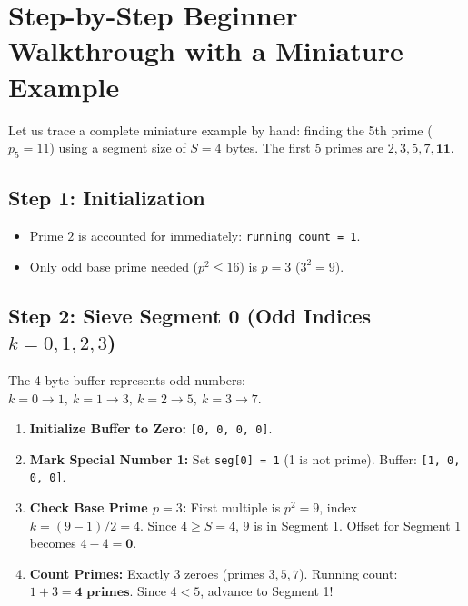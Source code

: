 \documentclass[11pt,a4paper]{article}
\begin{document}
\newpage

\section{Step-by-Step Beginner Walkthrough with a Miniature Example}

Let us trace a complete miniature example by hand: finding the 5th prime ($p_5 = 11$) using a segment size of $S = 4$ bytes. The first 5 primes are $2, 3, 5, 7, \mathbf{11}$.

\subsection{Step 1: Initialization}
\begin{itemize}\setlength{\itemsep}{0pt}
    \item Prime $2$ is accounted for immediately: \texttt{running\_count = 1}.
    \item Only odd base prime needed ($p^2 \le 16$) is $p = 3$ ($3^2 = 9$).
\end{itemize}

\subsection{Step 2: Sieve Segment 0 (Odd Indices $k = 0, 1, 2, 3$)}
The 4-byte buffer represents odd numbers: $k=0 \to 1, \ k=1 \to 3, \ k=2 \to 5, \ k=3 \to 7$.
\begin{enumerate}\setlength{\itemsep}{0pt}
    \item \textbf{Initialize Buffer to Zero:} \texttt{[0, 0, 0, 0]}.
    \item \textbf{Mark Special Number 1:} Set \texttt{seg[0] = 1} (1 is not prime). Buffer: \texttt{[1, 0, 0, 0]}.
    \item \textbf{Check Base Prime $p = 3$:} First multiple is $p^2 = 9$, index $k = (9-1)/2 = 4$. Since $4 \ge S=4$, 9 is in Segment 1. Offset for Segment 1 becomes $4 - 4 = \mathbf{0}$.
    \item \textbf{Count Primes:} Exactly 3 zeroes (primes $3, 5, 7$). Running count: $1 + 3 = \mathbf{4 \text{ primes}}$. Since $4 < 5$, advance to Segment 1!
\end{enumerate}
\end{document}

